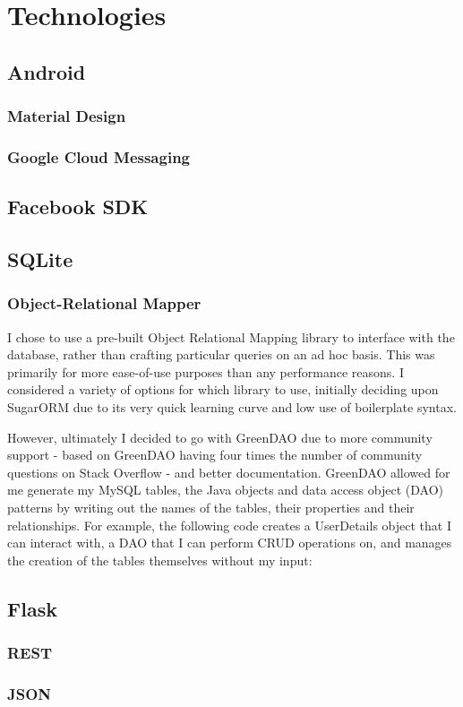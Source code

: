 \chapter{Technologies}

\section{Android}

\subsection{Material Design}

\subsection{Google Cloud Messaging}

\section{Facebook SDK}

\section{SQLite}

\subsection{Object-Relational Mapper}
I chose to use a pre-built Object Relational Mapping library to interface with the database, rather than crafting particular queries on an ad hoc basis.
This was primarily for more ease-of-use purposes than any performance reasons. 
I considered a variety of options for which library to use, initially deciding upon SugarORM due to its very quick learning curve and low use of boilerplate syntax. 

However, ultimately I decided to go with GreenDAO due to more community support - based on GreenDAO having four times the number of community questions on Stack Overflow - and better documentation.
GreenDAO allowed for me generate my MySQL tables, the Java objects and data access object (DAO) patterns by writing out the names of the tables, their properties and their relationships. 
For example, the following code creates a UserDetails object that I can interact with, a DAO that I can perform CRUD operations on, and manages the creation of the tables themselves without my input:


\section{Flask}

\subsection{REST}

\subsection{JSON}